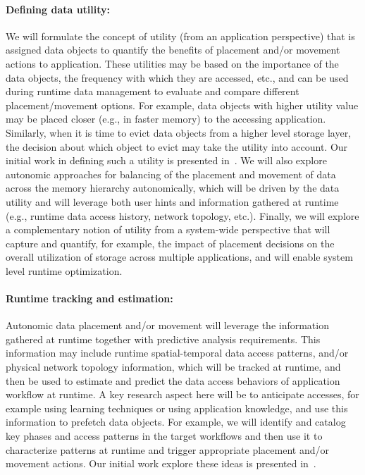 \paragraph{Defining data utility:} We will formulate the concept of utility (from an
application perspective) that is assigned data objects to quantify the
benefits of placement and/or movement actions to application. These
utilities may be based on the importance of the data objects, the frequency
with which they are accessed, etc., and can be used during runtime data
management to evaluate and compare different placement/movement options. 
For example, data objects with higher utility value may be
placed closer (e.g., in faster memory) to the accessing application.
Similarly, when it is time to evict data objects from a higher level storage
layer, the decision about which object to evict may take the utility into
account. Our initial work in defining such a utility is presented in~\cite{tongipdps15}.
 We will also explore autonomic approaches for balancing of the placement and 
 movement of data across the memory hierarchy autonomically, which will be driven 
 by the data utility and will leverage both user hints and information gathered at runtime (e.g., runtime data access
history, network topology, etc.).
Finally, we will explore a complementary notion of utility from a system-wide perspective 
that will capture and quantify, for example, the impact of placement decisions on 
the overall utilization of storage across multiple applications, and will enable system level runtime optimization. 


\paragraph{ Runtime tracking and estimation:}
Autonomic data placement and/or movement will leverage the information gathered 
at runtime together with predictive analysis requirements. This information may include 
runtime spatial-temporal data access patterns, and/or physical network topology
information, which will be tracked at runtime, and then be used to estimate and predict 
the data access behaviors of application workflow at runtime. 
A key research aspect here will be to anticipate accesses, for example using learning techniques or using
application knowledge, and use this information to prefetch data objects.
For example, we will identify and catalog key phases and access patterns
in the target workflows and then use it to characterize patterns at runtime
and trigger appropriate placement and/or movement actions. Our initial 
work explore these ideas is presented in~\cite{qiansc15}.

